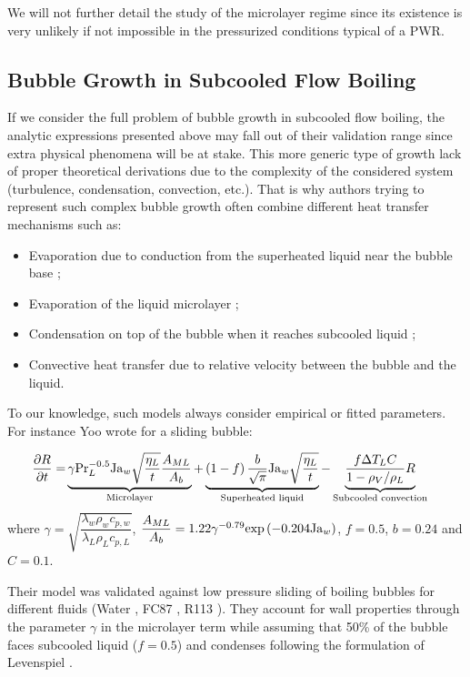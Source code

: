 We will not further detail the study of the microlayer regime since its existence is very unlikely if not impossible in the pressurized conditions typical of a PWR.


\subsection{Bubble Growth in Subcooled Flow Boiling}


If we consider the full problem of bubble growth in subcooled flow boiling, the analytic expressions presented above may fall out of their validation range since extra physical phenomena will be at stake. This more generic type of growth lack of proper theoretical derivations due to the complexity of the considered system (turbulence, condensation, convection, etc.). That is why authors trying to represent such complex bubble growth often combine different heat transfer mechanisms such as: 

\begin{itemize}
\item Evaporation due to conduction from the superheated liquid near the bubble base ;
\item Evaporation of the liquid microlayer ;
\item Condensation on top of the bubble when it reaches subcooled liquid ;
\item Convective heat transfer due to relative velocity between the bubble and the liquid.
\end{itemize}

To our knowledge, such models always consider empirical or fitted parameters. For instance Yoo \etal \cite{yoo_development_2018} wrote for a sliding bubble:


\begin{align}
 \frac{\partial{R}}{\partial t} = &\underbrace{ \gamma \mathrm{Pr}_{L}^{-0.5}\mathrm{Ja}_{w} \sqrt{\dfrac{\eta_{L}}{t}} \frac{A_{ML}}{A_{b}} }_{\text{Microlayer}} + \underbrace{\left( 1-f \right) \frac{b}{\sqrt{\pi}} \mathrm{Ja}_{w} \sqrt{\dfrac{\eta_{L}}{t}}}_{\text{Superheated liquid}} - \underbrace{\frac{f\Delta T_{L}C}{1-\rho_{V}/\rho_{L}}R}_{\text{Subcooled convection}}
\label{eq:growth_yoo}
\end{align}
where $\gamma = \sqrt{\dfrac{\lambda_{w}\rho_{w}c_{p,w}}{\lambda_{L}\rho_{L}c_{p,L}}}$, $\dfrac{A_{ML}}{A_{b}}=1.22 \gamma^{-0.79}\mathrm{exp}\left( -0.204\mathrm{Ja}_{w} \right)$, $f=0.5$, $b=0.24$ and $C=0.1$.

\npar
Their model was validated against low pressure sliding of boiling bubbles for different fluids (Water \cite{maity_effect_2000}, FC87 \cite{thorncroft_experimental_1998}, R113 \cite{yoo_experimental_2016}). They account for wall properties through the parameter $\gamma$ in the microlayer term while assuming that 50\% of the bubble faces subcooled liquid ($f=0.5$) and condenses following the formulation of Levenspiel \cite{levenspiel_collapse_1959}.


